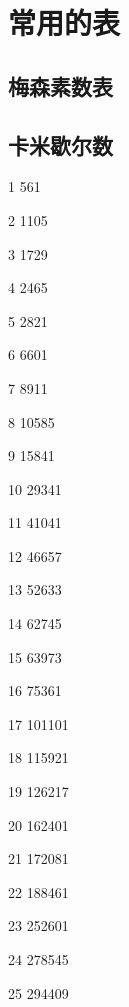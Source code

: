 \chapter{常用的表}


\section{梅森素数表}


\section{卡米歇尔数}
1 561

2 1105

3 1729

4 2465

5 2821

6 6601

7 8911

8 10585

9 15841

10 29341

11 41041

12 46657

13 52633

14 62745

15 63973

16 75361

17 101101

18 115921

19 126217

20 162401

21 172081

22 188461

23 252601

24 278545

25 294409

